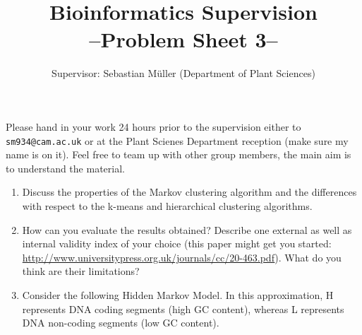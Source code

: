 \documentclass[11pt,runningheads,a4paper]{article}
\begin{document}

\title{{\LARGE Bioinformatics Supervision}\\
{\Large --Problem Sheet 3--}} 
\author{Supervisor: Sebastian Müller (Department of Plant Sciences)}
\date{}

\maketitle

Please hand in your work 24 hours prior to the supervision either to \texttt{sm934@cam.ac.uk} or at the Plant Scienes Department reception (make sure my name is on it). Feel free to team up with other group members, the main aim is to understand the material. 
\begin{enumerate}
	\item Discuss the properties of the Markov clustering algorithm and the differences with respect to the k-means and hierarchical clustering algorithms.
  \item How can you evaluate the results obtained? Describe one external as well as internal validity index of your choice (this paper might get you started: \url{http://www.universitypress.org.uk/journals/cc/20-463.pdf}). What do you think are their limitations?
	\item Consider the following Hidden Markov Model. In this approximation, H represents DNA coding segments (high GC content), whereas L represents DNA non-coding segments (low GC content).
		\begin{figure}[H]

\end{figure}
\end{enumerate}
\end{document}
